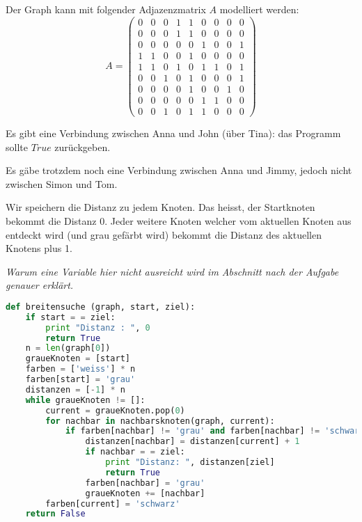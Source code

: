 \begin{lsg}
Der Graph kann mit folgender Adjazenzmatrix $A$ modelliert werden:
\[A =  \begin{pmatrix}
  0 & 0 & 0 & 1 & 1 & 0 & 0 & 0 & 0  \\
  0 & 0 & 0 & 1 & 1 & 0 & 0 & 0 & 0  \\
  0 & 0 & 0 & 0 & 0 & 1 & 0 & 0 & 1  \\
  1 & 1 & 0 & 0 & 1 & 0 & 0 & 0 & 0  \\
  1 & 1 & 0 & 1 & 0 & 1 & 1 & 0 & 1  \\
  0 & 0 & 1 & 0 & 1 & 0 & 0 & 0 & 1  \\
  0 & 0 & 0 & 0 & 1 & 0 & 0 & 1 & 0  \\
  0 & 0 & 0 & 0 & 0 & 1 & 1 & 0 & 0  \\
  0 & 0 & 1 & 0 & 1 & 1 & 0 & 0 & 0 
 \end{pmatrix}
  \]
\end{lsg}

\begin{lsg}
Es gibt eine Verbindung zwischen Anna und John (\"uber Tina): das Programm sollte $True$ zur\"uckgeben.
\end{lsg}

\begin{lsg}
Es g\"abe trotzdem noch eine Verbindung zwischen Anna und Jimmy, jedoch nicht zwischen Simon und Tom.
\end{lsg}

\begin{lsg}
Wir speichern die Distanz zu jedem Knoten. Das heisst, der Startknoten bekommt die Distanz 0. Jeder weitere Knoten welcher vom aktuellen Knoten aus entdeckt wird (und grau gef\"arbt wird) bekommt die Distanz des aktuellen Knotens plus 1.

\textit{Warum eine Variable hier nicht ausreicht wird im Abschnitt nach der Aufgabe genauer erkl\"art.}
\end{lsg}

\begin{lsg}
\hfill
\begin{lstlisting}[language=Python,basicstyle=\small,tabsize=3]
def breitensuche (graph, start, ziel):
	if start = = ziel:
		print "Distanz : ", 0
		return True
	n = len(graph[0])
	graueKnoten = [start]
	farben = ['weiss'] * n
	farben[start] = 'grau'
	distanzen = [-1] * n
	while graueKnoten != []:
		current = graueKnoten.pop(0)
		for nachbar in nachbarsknoten(graph, current):
			if farben[nachbar] != 'grau' and farben[nachbar] != 'schwarz':
				distanzen[nachbar] = distanzen[current] + 1
				if nachbar = = ziel:
					print "Distanz: ", distanzen[ziel]
					return True
				farben[nachbar] = 'grau'
				graueKnoten += [nachbar]
		farben[current] = 'schwarz'
	return False
\end{lstlisting}
\end{lsg}

